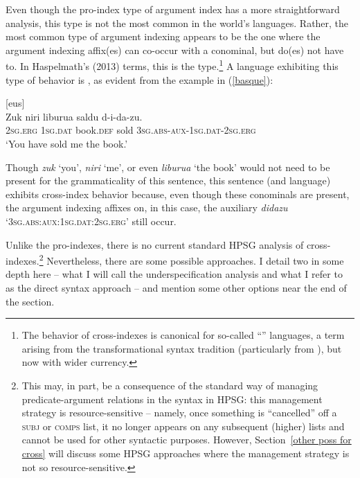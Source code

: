 \documentclass[output=paper
	        ,collection
	        ,collectionchapter
 	        ,biblatex
                ,babelshorthands
                ,newtxmath
                ,draftmode
                ,colorlinks, citecolor=brown
]{langscibook}
\begin{document}
Even though the pro-index type of argument index has a more straightforward analysis, this type is not the most common in the world's languages. Rather, the most common type of argument indexing appears to be the one where the argument indexing affix(es) can co-occur with a conominal, but do(es) not have to.  In Haspelmath's (2013) terms, this is the  type.\footnote{The behavior of cross-indexes is canonical for so-called ``'' languages, a term arising from the transformational syntax tradition (particularly from \citealt{Chomsky81a}), but now with wider currency.} A language exhibiting this type of behavior is , as evident from the example in (\ref{basque}):    
%
\begin{samepage}
\begin{exe}
\ex\label{basque}  [eus] \citep[98]{laka96} \\
\gll Zuk niri liburua saldu d-i-da-zu. \\
\textsc{2sg.erg} \textsc{1sg.dat} book.\textsc{def} sold \textsc{3sg.abs}-\textsc{aux}-\textsc{1sg.dat}-\textsc{2sg.erg} \\
\glt `You have sold me the book.' 
\end{exe} 
\end{samepage}
%
Though \textit{zuk} `you', \textit{niri} `me', or even \textit{liburua}  `the book' would not need to be present for the grammaticality of this sentence, this sentence (and language) exhibits cross-index behavior because, even though these conominals are present, the argument indexing affixes on, in this case, the auxiliary \textit{didazu} `\textsc{3sg.abs}:\-\textsc{aux}:\-\textsc{1sg.dat}:\-\textsc{2sg.erg}' still occur. 

Unlike the pro-indexes, there is no current standard HPSG analysis of cross-indexes.\footnote{This may, in part, be a consequence of the standard way of managing predicate-argument relations in the syntax in HPSG: this management strategy is resource-sensitive -- namely, once something is ``cancelled'' off a \textsc{subj} or \textsc{comps} list, it no longer appears on any subsequent (higher) lists and cannot be used for other syntactic purposes. However, Section~\ref{other poss for cross} will discuss some HPSG approaches where the management strategy is not so resource-sensitive.} Nevertheless, there are some possible approaches. I detail two in some depth here -- what I will call the underspecification analysis and what I refer to as the direct syntax approach -- and mention some other options near the end of the section.
\end{document}
